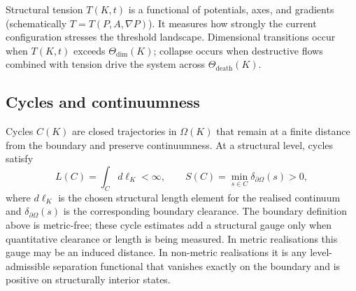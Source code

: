 Structural tension \(T(K,t)\) is a functional of potentials, axes, and gradients (schematically \(T=T(P,A,\nabla P)\)).
It measures how strongly the current configuration stresses the threshold landscape.
Dimensional transitions occur when \(T(K,t)\) exceeds \(\Theta_{\mathrm{dim}}(K)\); collapse occurs when destructive flows combined with tension drive the system across \(\Theta_{\mathrm{death}}(K)\).

\subsection{Cycles and continuumness}

Cycles \(C(K)\) are closed trajectories in \(\Omega(K)\) that remain at a finite distance from the boundary and preserve continuumness.
At a structural level, cycles satisfy
\[
    L(C) = \int_C d\ell_K < \infty,\qquad
    S(C) = \min_{s \in C} \delta_{\partial\Omega}(s) > 0,
\]
where \(d\ell_K\) is the chosen structural length element for the realised
continuum and \(\delta_{\partial\Omega}(s)\) is the corresponding boundary
clearance.
The boundary definition above is metric-free; these cycle estimates add a
structural gauge only when quantitative clearance or length is being measured.
In metric realisations this gauge may be an induced distance. In non-metric
realisations it is any level-admissible separation functional that vanishes
exactly on the boundary and is positive on structurally interior states.


